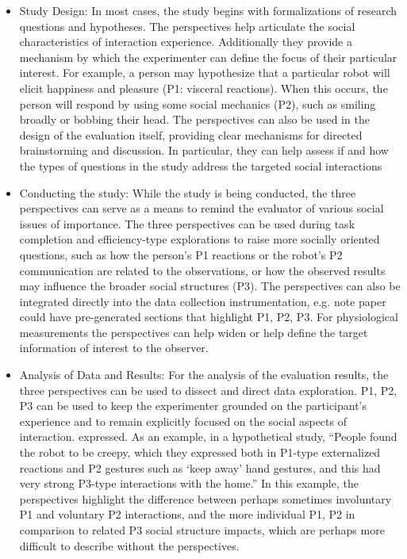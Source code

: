 \begin{itemize}
\item Study Design: In most cases, the study begins with formalizations of research questions and hypotheses. The perspectives help articulate the social characteristics of interaction experience. Additionally they provide a mechanism by which the experimenter can define the focus of their particular interest. For example, a person may hypothesize that a particular robot will elicit happiness and pleasure (P1: visceral reactions). When this occurs, the person will respond by using some social mechanics (P2), such as smiling broadly or bobbing their head. The perspectives can also be used in the design of the evaluation itself, providing clear mechanisms for directed brainstorming and discussion. In particular, they can help assess if and how the types of questions in the study address the targeted social interactions

\item Conducting the study: While the study is being conducted, the three perspectives can serve as a means to remind the evaluator of various social issues of importance. The three perspectives can be used during task completion and efficiency-type explorations to raise more socially oriented questions, such as how the person’s P1 reactions or the robot’s P2 communication are related to the observations, or how the observed results may influence the broader social structures (P3). The perspectives can also be integrated directly into the data collection instrumentation, e.g. note paper could have pre-generated sections that highlight P1, P2, P3. For physiological measurements the perspectives can help widen or help define the target information of interest to the observer.

\item Analysis of Data and Results: For the analysis of the evaluation results, the three perspectives can be used to dissect and direct data exploration. P1, P2, P3 can be used to keep the experimenter grounded on the participant’s experience and to remain explicitly focused on the social aspects of interaction. expressed. As an example, in a hypothetical study, “People found the robot to be creepy, which they expressed both in P1-type externalized reactions and P2 gestures such as ‘keep away’ hand gestures, and this had very strong P3-type interactions with the home.” In this example, the perspectives highlight the difference between perhaps sometimes involuntary P1 and voluntary P2 interactions, and the more individual P1, P2 in comparison to related P3 social structure impacts, which are perhaps more difficult to describe without the perspectives.

\end{itemize}

